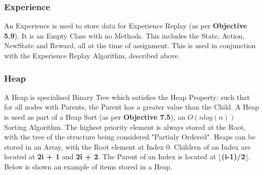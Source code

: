 \begin{flushleft}
            \subsubsection{Experience} 
                An Experience is used to store data for Experience Replay (as per \textbf{Objective 5.9}). It is an Empty Class with no Methods. This includes the State, 
                Action, NewState and Reward, all at the time of assignment. This is used in conjunction with the Experience Replay 
                Algorithm, described above.
            \subsubsection{Heap} 
                A Heap is specialised Binary Tree which satisfies the Heap Property: such that for all nodes with Parents, the
                Parent has a greater value than the Child. A Heap is used as part of a Heap Sort (as per \textbf{Objective 7.5}), an $O(nlog(n))$ Sorting Algorithm. The
                highest priority element is always stored at the Root, with the tree of the structure being considered "Partialy Ordered".
                Heaps can be stored in an Array, with the Root element at Index 0. Children of an Index are located at \textbf{2i + 1} and
                \textbf{2i + 2}. The Parent of an Index is located at \textbf{$\lfloor$(i-1)/2$\rfloor$}. Below is shown an example of items
                stored in a Heap.

                \begin{figure}[H]
                    \centering
                    \subfloat
                    {
                    }
                \end{figure}


\end{flushleft}
